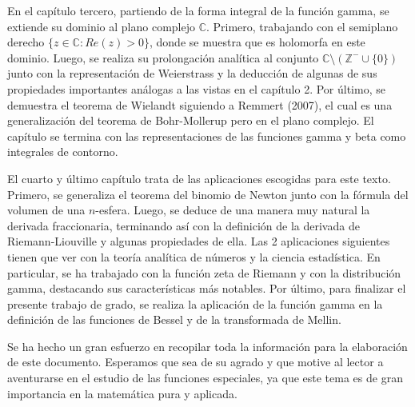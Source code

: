 En el capítulo tercero, partiendo de la forma integral de la función gamma, se extiende su dominio al plano complejo $\mathbb{C}$. Primero, trabajando con el semiplano derecho $\{z \in \mathbb{C} : Re(z)>0 \}$, donde se muestra que es holomorfa en este dominio. Luego, se realiza su prolongación analítica al conjunto $\mathbb{C}\texttt{\textbackslash}(\mathbb{Z}^- \cup \{0\})$ junto con la representación de Weierstrass y la deducción de algunas de sus propiedades importantes análogas a las vistas en el capítulo 2. Por último, se demuestra el teorema de Wielandt siguiendo a Remmert (2007), el cual es una generalización del teorema de Bohr-Mollerup pero en el plano complejo. El capítulo se termina con las representaciones de las funciones gamma y beta como integrales de contorno.

El cuarto y último capítulo trata de las aplicaciones escogidas para este texto. Primero, se generaliza el teorema del binomio de Newton junto con la fórmula del volumen de una $n$-esfera. Luego, se deduce de una manera muy natural la derivada fraccionaria, terminando así con la definición de la derivada de Riemann-Liouville y algunas propiedades de ella. Las 2 aplicaciones siguientes tienen que ver con la teoría analítica de números y la ciencia estadística. En particular, se ha trabajado con la función zeta de Riemann y con la distribución gamma, destacando sus características más notables. Por último, para finalizar el presente trabajo de grado, se realiza la aplicación de la función gamma en la definición de las funciones de Bessel y de la transformada de Mellin.

Se ha hecho un gran esfuerzo en recopilar toda la información para la elaboración de este documento. Esperamos que sea de su agrado y que motive al lector a aventurarse en el estudio de las funciones especiales, ya que este tema es de gran importancia en la matemática pura y aplicada.
\endinput